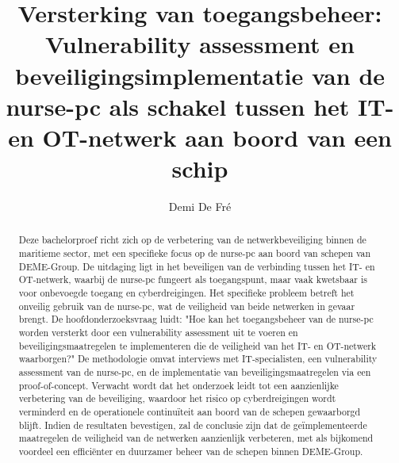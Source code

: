 \documentclass{hogent-article}
\title{Versterking van toegangsbeheer: Vulnerability assessment en 
beveiligingsimplementatie van de nurse-pc als schakel tussen het IT- en OT-netwerk aan boord van een schip}
\author{Demi De Fré}
\begin{document}
\begin{abstract}

  Deze bachelorproef richt zich op de verbetering van de netwerkbeveiliging binnen de maritieme sector, met een specifieke 
  focus op de nurse-pc aan boord van schepen van DEME-Group. De uitdaging ligt in het beveiligen van de verbinding tussen het 
  IT- en OT-netwerk, waarbij de nurse-pc fungeert als toegangspunt, maar vaak kwetsbaar is voor onbevoegde toegang en 
  cyberdreigingen. Het specifieke probleem betreft het onveilig gebruik van de nurse-pc, wat de veiligheid van beide netwerken 
  in gevaar brengt. De hoofdonderzoeksvraag luidt: "Hoe kan het toegangsbeheer van de nurse-pc worden versterkt door een 
  vulnerability assessment uit te voeren en beveiligingsmaatregelen te implementeren die de veiligheid van het IT- en OT-netwerk 
  waarborgen?" De methodologie omvat interviews met IT-specialisten, een vulnerability assessment van de nurse-pc, en de 
  implementatie van beveiligingsmaatregelen via een proof-of-concept. Verwacht wordt dat het onderzoek leidt tot een aanzienlijke 
  verbetering van de beveiliging, waardoor het risico op cyberdreigingen wordt verminderd en de operationele continuïteit aan boord 
  van de schepen gewaarborgd blijft. Indien de resultaten bevestigen, zal de conclusie zijn dat de geïmplementeerde maatregelen de 
  veiligheid van de netwerken aanzienlijk verbeteren, met als bijkomend voordeel een efficiënter en duurzamer beheer van de schepen 
  binnen DEME-Group.
\end{abstract}

\tableofcontents



\printbibliography[heading=bibintoc]
\end{document}
